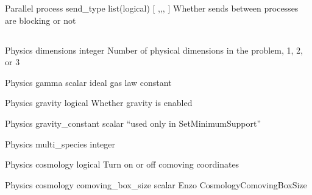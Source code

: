 \documentclass{book}
\begin{document}
\Parameter
{Parallel}
{process}
{send\_type}
{list(logical)}
{ [ ,,, ]}
{ Whether sends between processes are blocking or not}
{}
{}

\subsection{}

 	 	 	 	
\Parameter
{Physics}
{}
{dimensions}
{integer}
{}
{Number of physical dimensions in the problem, 1, 2, or 3}
{}
{}

\Parameter
{Physics}
{}
{gamma}
{scalar}
{}
{ideal gas law constant}
{}
{}

\Parameter
{Physics}
{}
{gravity}
{logical}
{}
{Whether gravity is enabled}
{}
{}

\Parameter
{Physics}
{}
{gravity\_constant}
{scalar}
{}
{``used only in SetMinimumSupport''}
{}
{}

\Parameter
{Physics}
{}
{multi\_species}
{integer}
{}
{}
{}
{}

\Parameter
{Physics}
{}
{cosmology}
{logical}
{}
{Turn on or off comoving coordinates}
{}
{}

\Parameter
{Physics}
{cosmology}
{comoving\_box\_size}
{scalar}
{}
{Enzo CosmologyComovingBoxSize}
{}
{}
 	 	 	 	
\end{document}
